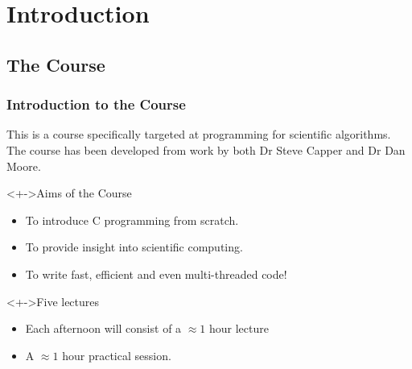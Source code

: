 \documentclass[smaller,handout,table]{beamer}
\subtitle{Lecture 1 of 5}
\begin{document}
{
\begin{frame}
  \titlepage
\end{frame}
}

\section{Introduction}
\subsection{The Course}

\begin{frame}
\frametitle{Introduction to the Course}
This is a course specifically targeted at programming for scientific algorithms.\\
The course has been developed from work by both Dr Steve Capper and Dr Dan Moore.
\begin{block}<+->{Aims of the Course}
\begin{itemize}
\item To introduce C programming from scratch.
\item To provide insight into scientific computing.
\item To write fast, efficient and even multi-threaded code!
\end{itemize}
\end{block}

\begin{block}<+->{Five lectures}
\begin{itemize}
\item Each afternoon will consist of a $\approx 1$ hour lecture
\item A $\approx 1$ hour practical session.
\end{itemize}
\end{block}
\end{frame}
\end{document}
